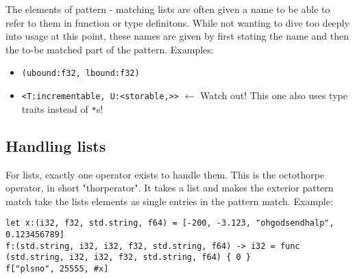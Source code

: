 \documentclass{scrartcl}
\begin{document}
The elements of pattern - matching lists are often given a name to be able to refer to them in function  or type definitons. While not wanting to dive too deeply into usage at this point, these names are given by first stating the name and then the to-be matched part of the pattern. Examples:

\begin{itemize}
	\item \lstinline|(ubound:f32, lbound:f32)|
	\item \lstinline|<T:incrementable, U:<storable,>>| $\leftarrow$ Watch out! This one also uses type traits instead of \lstinline|*|s!
\end{itemize}

\subsection{Handling lists}

For lists, exactly one operator exists to handle them. This is the octothorpe operator, in short "thorperator". It takes a list and makes the exterior pattern match take the lists elements as single entries in the pattern match. Example:

\smallskip

\begin{lstlisting}
let x:(i32, f32, std.string, f64) = [-200, -3.123, "ohgodsendhalp", 0.123456789]
f:(std.string, i32, i32, f32, std.string, f64) -> i32 = func (std.string, i32, i32, f32, std.string, f64) { 0 }
f["plsno", 25555, #x]
\end{lstlisting}





\end{document}
